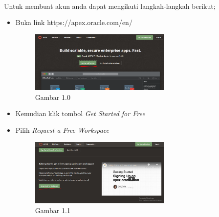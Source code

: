 \documentclass{article}
\begin{document}
    \paragraph{}Untuk membuat akun anda dapat mengikuti langkah-langkah berikut;
        \begin{itemize}
            \item Buka link https://apex.oracle.com/en/
                \begin{figure}[ht]
                    \centerline{\includegraphics[width=7cm]{Capture.PNG}}
                    \caption{Gambar 1.0}
                \end{figure}
            \item Kemudian klik tombol \textit{Get Started for Free}
            \item Pilih \textit{Request a Free Workspace} 
                 \begin{figure}[ht]
                    \centerline{\includegraphics[width=7cm]{Capture1.PNG}}
                    \caption{Gambar 1.1}
                \end{figure}
            

\end{itemize}
\end{document}
